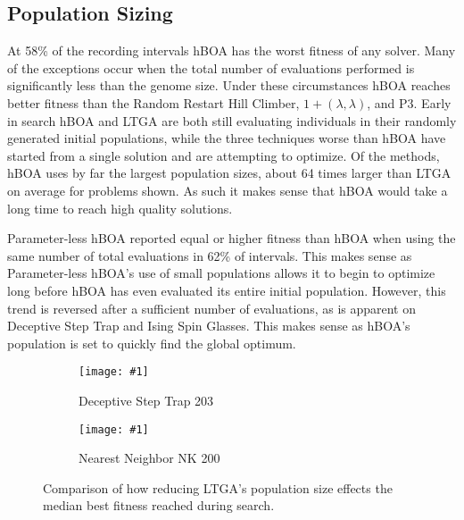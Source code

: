 \documentclass[twoside]{article}
\newcommand{\includegraphicsfit}[1]
{\texttt{[image: \#1]}}
\begin{document}
\subsection{Population Sizing}
\label{sec-pop-sizing}

At 58\% of the recording intervals hBOA has the worst fitness of any solver. Many of the exceptions occur when
the total number of evaluations performed is significantly less than the genome size. Under these circumstances hBOA reaches better fitness
than the Random Restart Hill Climber, $1+(\lambda, \lambda)$, and P3. Early in search hBOA and LTGA are both still evaluating
individuals in their randomly generated initial populations, while the three techniques worse than hBOA have started
from a single solution and are attempting to optimize. Of the methods, hBOA uses by far the largest population sizes,
about 64 times larger than LTGA on average for problems shown. As such it makes sense that hBOA would take a long time to reach high
quality solutions.

Parameter-less hBOA reported equal or higher fitness than hBOA when using the same number of total evaluations in 62\% of intervals. This makes
sense as Parameter-less hBOA's use of small populations allows it to begin to optimize long before hBOA has even evaluated
its entire initial population. However, this trend is reversed after a sufficient number of evaluations, as is apparent
on Deceptive Step Trap and Ising Spin Glasses. This makes sense as hBOA's population is set to quickly find the global
optimum.



\begin{figure}[t]
  \begin{centering}
    \begin{subfigure}{.5\textwidth}
      \begin{centering}
        \includegraphicsfit{small-pop-dst}
      \end{centering}
      \caption{Deceptive Step Trap 203}
      \label{fig-small-pop-dst}
    \end{subfigure}%
    \begin{subfigure}{.5\textwidth}
      \begin{centering}
        \includegraphicsfit{small-pop-nk}
      \end{centering}
      \caption{Nearest Neighbor NK 200}
      \label{fig-small-pop-nk}
    \end{subfigure}
  \end{centering}
  \caption{Comparison of how reducing LTGA's population size effects
           the median best fitness reached during search.}
  \label{fig-small-pop}
\end{figure}
\end{document}
